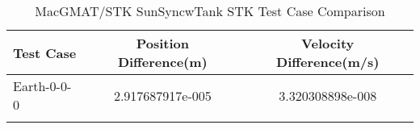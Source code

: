 \begin{table}[htbp!]
\centering
\caption{ MacGMAT/STK SunSyncwTank STK Test Case Comparison}
      \begin{tabular}{lcc}
      \hline\hline
          Test Case & Position Difference(m) & Velocity Difference(m/s) \\
         \hline
         Earth-0-0-0 & 2.917687917e-005 & 3.320308898e-008 \\
      \hline\hline
      \label{Table: SunSyncwTank STK Table} 
\end{tabular}
\end{table}
